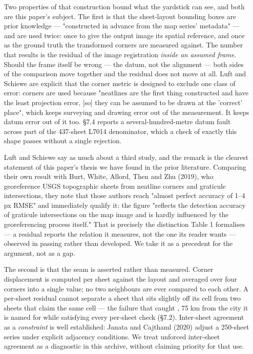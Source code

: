 \documentclass[11pt,a4paper]{article}
\begin{document}
Two properties of that construction bound what the yardstick can see, and both are this paper's subject. The first is that the sheet-layout bounding boxes are prior knowledge — "constructed in advance from the map series' metadata" — and are used twice: once to give the output image its spatial reference, and once as the ground truth the transformed corners are measured against. The number that results is the residual of the image registration \emph{inside an assumed frame}. Should the frame itself be wrong — the datum, not the alignment — both sides of the comparison move together and the residual does not move at all. Luft and Schiewe are explicit that the corner metric is designed to exclude one class of error: corners are used because "neatlines are the first thing constructed and have the least projection error, [so] they can be assumed to be drawn at the 'correct' place", which keeps surveying and drawing error out of the measurement. It keeps datum error out of it too. §7.4 reports a several-hundred-metre datum fault across part of the 437-sheet L7014 denominator, which a check of exactly this shape passes without a single rejection.

Luft and Schiewe say as much about a third study, and the remark is the clearest statement of this paper's thesis we have found in the prior literature. Comparing their own result with Burt, White, Allord, Then and Zhu (2019), who georeference USGS topographic sheets from neatline corners and graticule intersections, they note that those authors reach "almost perfect accuracy of 1–4 px RMSE" and immediately qualify it: the figure "reflects the detection accuracy of graticule intersections on the map image and is hardly influenced by the georeferencing process itself." That is precisely the distinction Table 1 formalises — a residual reports the relation it measures, not the one its reader wants — observed in passing rather than developed. We take it as a precedent for the argument, not as a gap.

The second is that the seam is asserted rather than measured. Corner displacement is computed per sheet against the layout and averaged over four corners into a single value; no two neighbours are ever compared to each other. A per-sheet residual cannot separate a sheet that sits slightly off its cell from two sheets that claim the same cell — the failure that caught \texttt{}, 75 km from the city it is named for while satisfying every per-sheet check (§7.2). Inter-sheet agreement as a \emph{constraint} is well established: Janata and Cajthaml (2020) adjust a 250-sheet series under explicit adjacency conditions. We treat unforced inter-sheet agreement as a diagnostic in this archive, without claiming priority for that use.
\end{document}

